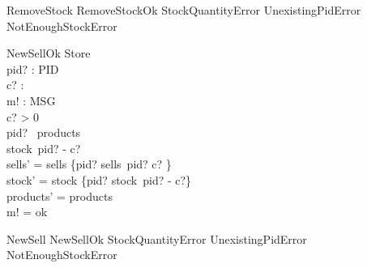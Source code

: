 \begin{zed}
RemoveStock  RemoveStockOk \lor StockQuantityError \lor UnexistingPidError \lor NotEnoughStockError
\end{zed}

\begin{schema}{NewSellOk}
\Delta Store \\
pid? : PID \\
c? : \nat \\
m! : MSG \\
\where
c? > 0 \\
pid? \in \dom~products \\
stock~pid? - c? \\
sells' = sells \oplus \{pid? \mapsto sells~pid? \cat \langle c? \rangle\} \\
stock' = stock \oplus \{pid? \mapsto stock~pid? - c?\} \\
products' = products \\
m! = ok
\end{schema}

\begin{zed} 
NewSell  NewSellOk \lor StockQuantityError \lor UnexistingPidError \lor NotEnoughStockError 
\end{zed}